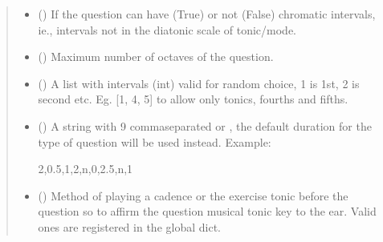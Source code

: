 \documentclass[letterpaper,10pt,english]{sphinxmanual}
\begin{document}
\begin{fulllineitems}
\begin{fulllineitems}
\begin{quote}
\begin{description}
\begin{itemize}
\item {} 
\sphinxAtStartPar
{} () \textendash{} If the question can have (True) or not (False)
chromatic intervals, ie., intervals not in the diatonic scale
of tonic/mode.

\item {} 
\sphinxAtStartPar
{} () \textendash{} Maximum number of octaves of the question.

\item {} 
\sphinxAtStartPar
{} () \textendash{} A list with intervals (int) valid for
random choice, 1 is 1st, 2 is second etc. Eg. {[}1, 4, 5{]} to
allow only tonics, fourths and fifths.

\item {} 
\sphinxAtStartPar
{} () \textendash{} 
\sphinxAtStartPar
A string with 9 comma\sphinxhyphen{}separated  or
, the
default duration for the type of question will be used instead.
Example:

\begin{sphinxVerbatim}[commandchars=\\\{\}]
\PYGZdq{}2,0.5,1,2,n,0,2.5,n,1\PYGZdq{}
\end{sphinxVerbatim}


\item {} 
\sphinxAtStartPar
{} () \textendash{} Method of playing a cadence or the
exercise tonic before the question so to affirm the question
musical tonic key to the ear. Valid ones are registered in the
 global dict.


\end{itemize}
\end{description}
\end{quote}
\end{fulllineitems}
\end{fulllineitems}
\end{document}
